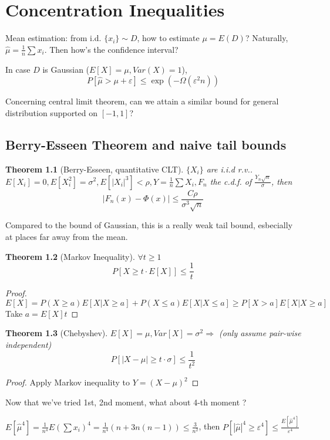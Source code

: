 \documentclass{book}
\newcommand{\rv}{r.v.}
\newtheorem{Thm}{Theorem}[section]
\begin{document}
\chapter{Concentration Inequalities}
Mean estimation: from i.d. $\{x_{i}\}\sim D$, how to estimate $\mu=E(D)$? Naturally, $\hat\mu=\frac{1}{n}\sum x_{i}$. Then how's the confidence interval?

In case $D$ is Gaussian ($E[X]=\mu, Var(X)=1$),
\[P[\hat\mu>\mu+\varepsilon]\leq \exp(-\Omega(\varepsilon^{2}n))\]

Concerning central limit theorem, can we attain a similar bound for general distribution supported on $[-1,1]$?

\section{Berry-Esseen Theorem and naive tail bounds}

\begin{Thm}[Berry-Esseen, quantitative CLT]
  $\{X_{i}\}$ are i.i.d \rv. $E[X_{i}]=0,E[X_{i}^{2}]=\sigma^{2},E[|X_{i}|^{3}]<\rho, Y=\frac{1}{n}\sum X_{i}, F_{n}$ the c.d.f. of $\frac{Y_{n}\sqrt{n}}{\sigma}$, then
  \[|F_{n}(x)-\Phi(x)|\leq\frac{C\rho}{\sigma^{3}\sqrt{n}}\]
\end{Thm}

Compared to the bound of Gaussian, this is a really weak tail bound, esbecially at places far away from the mean.

\begin{Thm}[Markov Inequality]
  $\forall t\geq 1$\[P[X\geq t\cdot E[X]]\leq \frac{1}{t}\]
\end{Thm}
\begin{proof}
  \[E[X]=P(X\geq a)E[X|X\geq a]+P(X\leq a)E[X|X\leq a]\geq P[X>a]E[X|X\geq a]\]
  Take $a=E[X]t$
\end{proof}

\begin{Thm}[Chebyshev]
  $E[X]=\mu,Var[X]=\sigma^{2}\Rightarrow$ (only assume pair-wise independent)
  \[P[|X-\mu|\geq t\cdot\sigma]\leq \frac{1}{t^{2}}\]
\end{Thm}
\begin{proof}
  Apply Markov inequality to $Y=(X-\mu)^{2}$
\end{proof}

Now that we've tried 1st, 2nd moment, what about 4-th moment ?

$E[\hat\mu^{4}]=\frac{1}{n^{4}}E(\sum x_{i})^{4}=\frac{1}{n^{4}}(n+3n(n-1))\leq \frac{3}{n^{2}}$, then $P[|\hat\mu|^{4}\geq \varepsilon^{4}]\leq \frac{E[\hat \mu^{4}]}{\varepsilon^{4}}$
\end{document}

